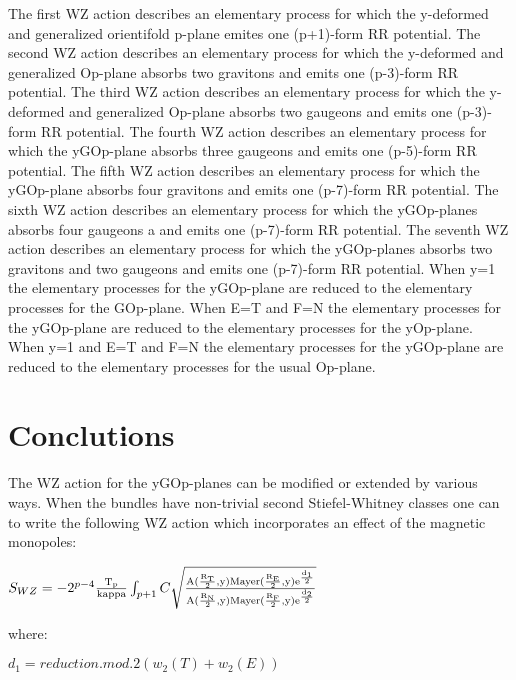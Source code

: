 \documentclass[a4paper,a4paper]{article}
\begin{document}
The first WZ action describes an elementary process for which the y-deformed and generalized orientifold p-plane emites one (p+1)-form RR potential.
The second WZ action describes an elementary process for which the y-deformed and generalized Op-plane absorbs two gravitons and emits one (p-3)-form RR potential.
The third WZ action describes an elementary process for which the y-deformed and generalized Op-plane absorbs two gaugeons and emits one (p-3)-form RR potential.
The fourth WZ action describes an elementary process for which the yGOp-plane absorbs three gaugeons and emits one (p-5)-form RR potential. 
The fifth WZ action describes an elementary process for which the yGOp-plane absorbs four gravitons and emits one (p-7)-form RR potential.
The sixth WZ action describes an elementary process for which the yGOp-planes absorbs four gaugeons a and emits one (p-7)-form RR potential.
The seventh WZ action describes an elementary process for which the yGOp-planes absorbs two gravitons and two gaugeons  and emits one (p-7)-form RR potential.
When y=1 the elementary processes for the yGOp-plane are reduced to the elementary processes for the GOp-plane.  When E=T and F=N the elementary processes for the yGOp-plane are reduced to the elementary processes for the yOp-plane.  When y=1 and E=T and F=N the elementary processes for the yGOp-plane are reduced to the elementary processes for the usual Op-plane.
 
\section{Conclutions}

The WZ action for the yGOp-planes can be modified or extended by various ways.
When the bundles have non-trivial second Stiefel-Whitney classes one can to write the following WZ action which incorporates an effect of the magnetic monopoles:

\begin{center}
{  $ S_{WZ} = -2^{p-4}\frac{\rm T_p}{\rm kappa}\int_{p+1} C\sqrt{\frac{\rm A(\frac{\rm R_T}{\rm 2},y)Mayer(\frac{\rm R_E}{\rm 2},y)e^{\frac{\rm d_1}{\rm 2}}}{\rm A(\frac{\rm R_N}{\rm 2},y)Mayer(\frac{\rm R_F}{\rm 2},y)e^{\frac{\rm d_2}{\rm 2}}}}$ }
\end{center}

where:

\begin{center}
{  $ d_1 = reduction.mod.2(w_2(T)+w_2(E))$ }
\end{center}
\end{document}
